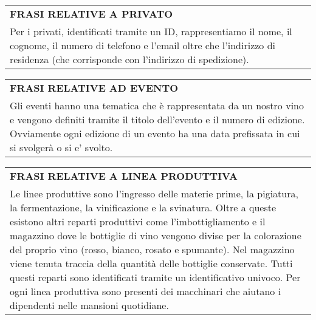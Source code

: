 \begin{center}
	\vspace{0.5cm}

	\begin{tabular}{P{16cm}}
		\toprule
		 \textbf {\large {FRASI RELATIVE A PRIVATO}}                                                                                                                  \\
		Per i privati, identificati tramite un ID, rappresentiamo il nome, il cognome, il numero di telefono e l'email oltre che l'indirizzo di residenza (che corrisponde con l'indirizzo di spedizione). \\
		\bottomrule
	\end{tabular}

	\vspace{0.5cm}

	\begin{tabular}{P{16cm}}
		\toprule
		 \textbf {\large {FRASI RELATIVE AD EVENTO}}                                                                                                                                    \\
		Gli eventi hanno una tematica che è rappresentata da un nostro vino e vengono definiti tramite il titolo dell'evento e il numero di edizione. Ovviamente ogni edizione di un evento ha una data prefissata in cui si svolgerà o si e' svolto. \\
		\bottomrule
	\end{tabular}

	\vspace{0.5cm}

	\begin{tabular}{P{16cm}}
		\toprule
		 \textbf {\large {FRASI RELATIVE A LINEA PRODUTTIVA}}                                                                                                                                                                                                                                                                                                                                                                                                                                                                                                         \\
		Le linee produttive sono l'ingresso delle materie prime, la pigiatura, la fermentazione, la vinificazione e la svinatura. Oltre a queste esistono altri reparti produttivi come l'imbottigliamento e il magazzino dove le bottiglie di vino vengono divise per la colorazione del proprio vino (rosso, bianco, rosato e spumante). Nel magazzino viene tenuta traccia della quantità delle bottiglie conservate. Tutti questi reparti sono identificati tramite un identificativo univoco. Per ogni linea produttiva sono presenti dei macchinari che aiutano i dipendenti nelle mansioni quotidiane. \\
		\bottomrule
	\end{tabular}


\end{center}
